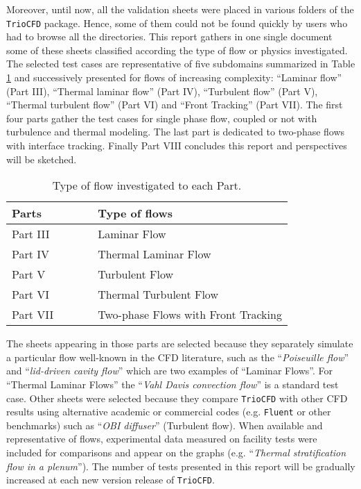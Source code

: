 Moreover, until now, all the validation sheets were placed in various
folders of the \texttt{TrioCFD} package. Hence, some of them could not
be found quickly by users who had to browse all the directories. This
report gathers in one single document some of these sheets classified according
the type of flow or physics investigated. The selected
test cases are representative of five subdomains summarized in Table
\ref{tab:Type-of-flows} and successively presented for flows
of increasing complexity: \textquotedblleft Laminar flow\textquotedblright{}
(Part III), \textquotedblleft Thermal laminar flow\textquotedblright{}
(Part IV), \textquotedblleft Turbulent flow\textquotedblright{} (Part
V), \textquotedblleft Thermal turbulent flow\textquotedblright{} (Part
VI) and \textquotedblleft Front Tracking\textquotedblright{} (Part
VII). The first four parts gather the test cases for single phase flow,
coupled or not with turbulence and thermal modeling. The
last part is dedicated to two-phase flows with interface tracking.
Finally Part VIII concludes this report and perspectives will be sketched.
\newpage
\vspace{2cm}
\begin{table}[H]
\begin{centering}
\begin{tabular}{lll}
\hline 
\textbf{Parts} & $\qquad$ & \textbf{Type of flows}\tabularnewline
\hline 
Part III &  & Laminar Flow\tabularnewline
Part IV &  & Thermal Laminar Flow\tabularnewline
Part V &  & Turbulent Flow\tabularnewline
Part VI &  & Thermal Turbulent Flow\tabularnewline
Part VII &  & Two-phase Flows with Front Tracking\tabularnewline
\hline 
\end{tabular}
\par\end{centering}
\caption{\label{tab:Type-of-flows}Type of flow investigated to each Part.}
\end{table}

The sheets appearing in those parts are selected because they separately
simulate a particular flow well-known in the CFD literature,
such as the ``\emph{Poiseuille flow}'' and ``\emph{lid-driven cavity
flow}'' which are two examples of ``Laminar Flows''. For ``Thermal
Laminar Flows'' the ``\emph{Vahl Davis convection flow}'' is a
standard test case. Other sheets were selected because they compare
\texttt{TrioCFD} with other CFD results using alternative academic
or commercial codes (e.g. \texttt{Fluent} or other benchmarks) such
as ``\emph{OBI diffuser}'' (Turbulent flow). When available and
representative of flows, experimental data measured on facility tests
were included for comparisons and appear on the graphs (e.g. ``\emph{Thermal
stratification flow in a plenum}''). The number of tests presented in this
report will be gradually increased at each new version release of \texttt{TrioCFD}.\medskip\newline


